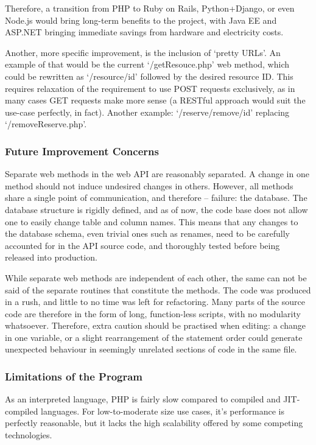         Therefore, a transition from PHP to Ruby on Rails, Python+Django, or even Node.js would bring long-term benefits to the project, with Java EE and ASP.NET bringing immediate savings from hardware and electricity costs.
    
        Another, more specific improvement, is the inclusion of `pretty URLs'. An example of that would be the current `/getResouce.php' web method, which could be rewritten as `/resource/{id}' followed by the desired resource ID. This requires relaxation of the requirement to use POST requests exclusively, as in many cases GET requests make more sense (a RESTful approach would suit the use-case perfectly, in fact). Another example: `/reserve/remove/{id}' replacing `/removeReserve.php'.

    \subsubsection{Future Improvement Concerns}

        Separate web methods in the web API are reasonably separated. A change in one method should not induce undesired changes in others. However, all methods share a single point of communication, and therefore -- failure: the database. The database structure is rigidly defined, and as of now, the code base does not allow one to easily change table and column names. This means that any changes to the database schema, even trivial ones such as renames, need to be carefully accounted for in the API source code, and thoroughly tested before being released into production.
    
        While separate web methods are independent of each other, the same can not be said of the separate routines that constitute the methods. The code was produced in a rush, and little to no time was left for refactoring. Many parts of the source code are therefore in the form of long, function-less scripts, with no modularity whatsoever. Therefore, extra caution should be practised when editing: a change in one variable, or a slight rearrangement of the statement order could generate unexpected behaviour in seemingly unrelated sections of code in the same file.

    \subsubsection{Limitations of the Program}
        As an interpreted language, PHP is fairly slow compared to compiled and JIT-compiled languages. For low-to-moderate size use cases, it's performance is perfectly reasonable, but it lacks the high scalability offered by some competing technologies. 
    
